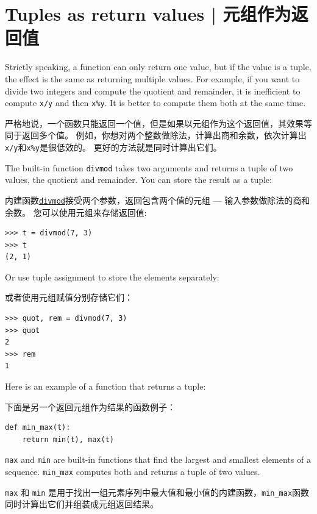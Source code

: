\section{Tuples as return values | 元组作为返回值}
  

Strictly speaking, a function can only return one value, but
if the value is a tuple, the effect is the same as returning
multiple values.  For example, if you want to divide two integers
and compute the quotient and remainder, it is inefficient to
compute {\tt x/y} and then {\tt x\%y}.  It is better to compute
them both at the same time.

严格地说，一个函数只能返回一个值，但是如果以元组作为这个返回值，其效果等同于返回多个值。 例如，你想对两个整数做除法，计算出商和余数，依次计算出\lstinline{x/y}和\lstinline{x%y}是很低效的。 更好的方法就是同时计算出它们。

The built-in function {\tt divmod} takes two arguments and
returns a tuple of two values, the quotient and remainder.
You can store the result as a tuple:

内建函数\href{https://docs.python.org/3/library/functions.html#divmod}{\lstinline{divmod}}接受两个参数，返回包含两个值的元组 --- 输入参数做除法的商和余数。 您可以使用元组来存储返回值:

\begin{lstlisting}
>>> t = divmod(7, 3)
>>> t
(2, 1)
\end{lstlisting}
%
Or use tuple assignment to store the elements separately:

或者使用元组赋值分别存储它们：


\begin{lstlisting}
>>> quot, rem = divmod(7, 3)
>>> quot
2
>>> rem
1
\end{lstlisting}
%
Here is an example of a function that returns a tuple:

下面是另一个返回元组作为结果的函数例子：

\begin{lstlisting}
def min_max(t):
    return min(t), max(t)
\end{lstlisting}
%
{\tt max} and {\tt min} are built-in functions that find
the largest and smallest elements of a sequence.  \verb"min_max"
computes both and returns a tuple of two values.

\lstinline{max} 和 \lstinline{min} 是用于找出一组元素序列中最大值和最小值的内建函数，\lstinline{min_max}函数同时计算出它们并组装成元组返回结果。
 
 



